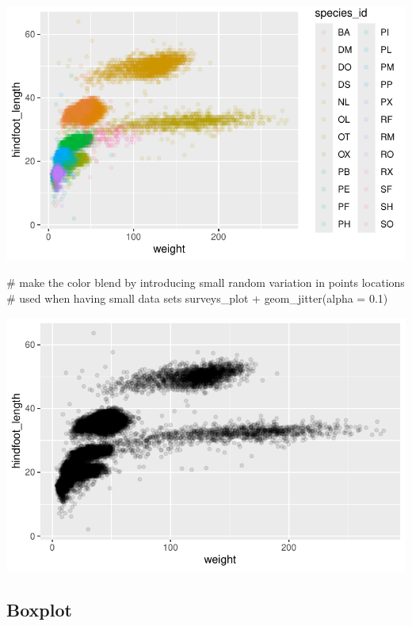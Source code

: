 \documentclass[
  letterpaper,
  DIV=11,
  numbers=noendperiod]{scrreprt}
\newenvironment{Shaded}{\begin{snugshade}}{\end{snugshade}}
\newcommand{\AttributeTok}[1]{\textcolor[rgb]{0.40,0.45,0.13}{#1}}
\newcommand{\CommentTok}[1]{\textcolor[rgb]{0.37,0.37,0.37}{#1}}
\newcommand{\FloatTok}[1]{\textcolor[rgb]{0.68,0.00,0.00}{#1}}
\newcommand{\FunctionTok}[1]{\textcolor[rgb]{0.28,0.35,0.67}{#1}}
\newcommand{\NormalTok}[1]{\textcolor[rgb]{0.00,0.23,0.31}{#1}}
\newcommand{\SpecialCharTok}[1]{\textcolor[rgb]{0.37,0.37,0.37}{#1}}
\begin{document}
\includegraphics{src/notebooks/r_files/figure-pdf/unnamed-chunk-49-4.pdf}

\begin{Shaded}
\begin{Highlighting}[]
\CommentTok{\# make the color blend by introducing small random variation in points locations}
\CommentTok{\# used when having small data sets}
\NormalTok{surveys\_plot }\SpecialCharTok{+} \FunctionTok{geom\_jitter}\NormalTok{(}\AttributeTok{alpha =} \FloatTok{0.1}\NormalTok{)}
\end{Highlighting}
\end{Shaded}

\includegraphics{src/notebooks/r_files/figure-pdf/unnamed-chunk-49-5.pdf}

\subsection{Boxplot}\label{boxplot}
\end{document}
